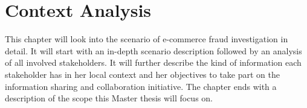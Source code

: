 
\chapter{Context Analysis} %
\label{cha:context_analysis}

This chapter will look into the scenario of e-commerce fraud investigation in detail.
It will start with an in-depth scenario description followed by an analysis of all involved stakeholders.
It will further describe the kind of information each stakeholder has in her local context and her objectives to take
part on the information sharing and collaboration initiative. The chapter ends with a description of the scope
this Master thesis will focus on.









